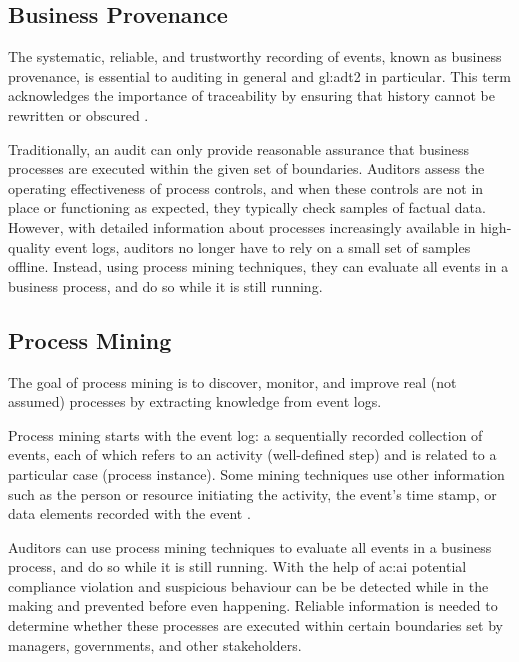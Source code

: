 \subsection{Business Provenance}

The systematic, reliable, and trustworthy recording of events, known as business provenance, is essential to auditing in general and \gls{gl:adt2} in particular. This term acknowledges the importance of traceability by ensuring that history cannot be rewritten or obscured \citep{5427384}.

Traditionally, an audit can only provide reasonable assurance that business processes are executed within the given set of boundaries. Auditors assess the operating effectiveness of process controls, and when these controls are not in place or functioning as expected, they typically check samples of factual data. However, with detailed information about processes increasingly available in high-quality event logs, auditors no longer have to rely on a small set of samples offline. Instead, using process mining techniques, they can evaluate all events in a business process, and do so while it is still running.



\subsection{Process Mining}

The goal of process mining is to discover, monitor, and improve real (not assumed) processes by extracting knowledge from event logs. 

Process mining starts with the event log: a sequentially recorded collection of events, each of which refers to an activity (well-defined step) and is related to a particular case (process instance). Some mining techniques use other information such as the person or resource initiating the activity, the event's time stamp, or data elements recorded with the event \citep{5427384}.

Auditors can use process mining techniques to evaluate all events in a business process, and do so while it is still running. With the help of \gls{ac:ai} potential compliance violation and suspicious behaviour can be be detected while in the making and prevented before even happening. Reliable information is needed to determine whether these processes are executed within certain boundaries set by managers, governments, and other stakeholders. 

